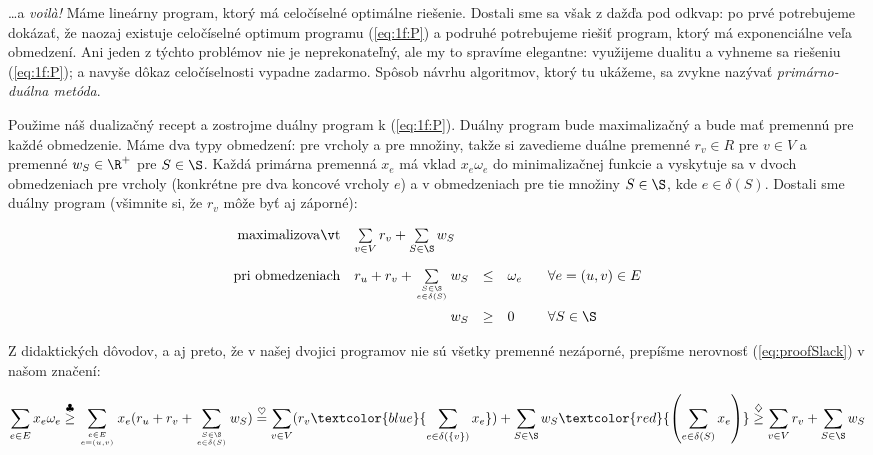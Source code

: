 \noindent
\ldots a {\em voilà!} Máme lineárny program, ktorý má celočíselné optimálne riešenie.
Dostali sme sa však z dažďa pod odkvap: po prvé potrebujeme dokázať, že naozaj existuje
celočíselné optimum programu (\ref{eq:1f:P}) a podruhé potrebujeme riešiť program, ktorý má 
exponenciálne veľa obmedzení. Ani jeden z týchto problémov nie je neprekonateľný, ale my
to spravíme elegantne: využijeme dualitu a vyhneme sa riešeniu (\ref{eq:1f:P}); a navyše 
dôkaz celočíselnosti vypadne zadarmo.
Spôsob návrhu algoritmov, ktorý tu ukážeme, sa zvykne nazývať {\em primárno-duálna metóda}.

\noindent
Použime náš dualizačný recept a zostrojme duálny program k (\ref{eq:1f:P}).
Duálny program bude maximalizačný a bude mať premennú pre každé obmedzenie. Máme dva typy
obmedzení: pre vrcholy a pre množiny, takže si zavedieme duálne premenné $r_v\in R$ pre $v\in V$
a premenné $w_S\in\R^+$ pre $S\in\S$.
Každá primárna premenná  $x_e$ má vklad $x_e\omega_e$ do minimalizačnej funkcie a vyskytuje
sa v dvoch obmedzeniach pre vrcholy (konkrétne pre dva koncové vrcholy $e$) a v obmedzeniach
pre tie množiny $S\in\S$, kde $e\in\delta(S)$.
Dostali sme duálny program (všimnite si, že $r_v$ môže byť aj záporné):

\begin{equation}
  \label{eq:1f:D}
\begin{array}{rrcll}
  {\rm maximalizovať}     & \multicolumn{1}{l}{\sum\limits_{v\in V}r_v + \sum\limits_{S\in\S}w_S}\\[4ex]
  {\rm pri\ obmedzeniach} & 
        r_u + r_v + \sum\limits_{S\in\S\atop e\in\delta(S)} w_S &\le&\omega_e& \;\;\;\forall e=(u,v)\in E\\[4ex]
                          & w_S&\ge&0& \;\;\;\forall S\in\S\\
\end{array}
\end{equation}

\noindent
Z didaktických dôvodov, a aj preto, že v našej dvojici programov nie sú všetky premenné nezáporné,
prepíšme nerovnosť (\ref{eq:proofSlack}) v našom značení:


$$
\sum_{e\in E}x_e\omega_e
\stackrel{\clubsuit}{\ge}
\sum_{e\in E\atop e=(u,v)}x_e(r_u+r_v+\sum_{S\in\S\atop e\in\delta(S)}w_S)
\stackrel{\heartsuit}{=}
\sum_{v\in V}(r_v  \textcolor{blue}{\sum_{e\in\delta(\{v\})}x_e} )   + \sum_{S\in\S}w_S
\textcolor{red}{\left(\sum_{e\in\delta(S)}x_e\right)}
\stackrel{\diamondsuit}{\ge}
\sum_{v\in V}r_v+\sum_{S\in\S}w_S
$$


